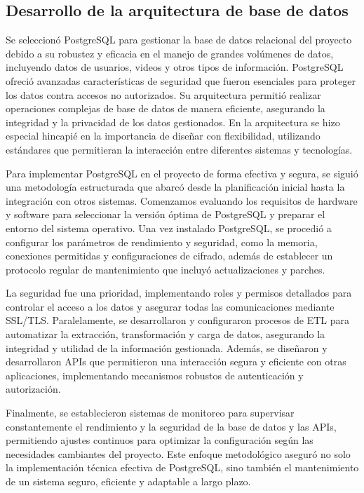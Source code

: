 \subsection{Desarrollo de la arquitectura de base de datos}

Se seleccionó PostgreSQL para gestionar la base de datos relacional del proyecto debido a su robustez y eficacia en el manejo de grandes volúmenes de datos, incluyendo datos de usuarios, videos y otros tipos de información. PostgreSQL ofreció avanzadas características de seguridad que fueron esenciales para proteger los datos contra accesos no autorizados. Su arquitectura permitió realizar operaciones complejas de base de datos de manera eficiente, asegurando la integridad y la privacidad de los datos gestionados. En la arquitectura se hizo especial hincapié en la importancia de diseñar con flexibilidad, utilizando estándares que permitieran la interacción entre diferentes sistemas y tecnologías.

Para implementar PostgreSQL en el proyecto de forma efectiva y segura, se siguió una metodología estructurada que abarcó desde la planificación inicial hasta la integración con otros sistemas. Comenzamos evaluando los requisitos de hardware y software para seleccionar la versión óptima de PostgreSQL y preparar el entorno del sistema operativo. Una vez instalado PostgreSQL, se procedió a configurar los parámetros de rendimiento y seguridad, como la memoria, conexiones permitidas y configuraciones de cifrado, además de establecer un protocolo regular de mantenimiento que incluyó actualizaciones y parches.

La seguridad fue una prioridad, implementando roles y permisos detallados para controlar el acceso a los datos y asegurar todas las comunicaciones mediante SSL/TLS. Paralelamente, se desarrollaron y configuraron procesos de ETL para automatizar la extracción, transformación y carga de datos, asegurando la integridad y utilidad de la información gestionada. Además, se diseñaron y desarrollaron APIs que permitieron una interacción segura y eficiente con otras aplicaciones, implementando mecanismos robustos de autenticación y autorización.

Finalmente, se establecieron sistemas de monitoreo para supervisar constantemente el rendimiento y la seguridad de la base de datos y las APIs, permitiendo ajustes continuos para optimizar la configuración según las necesidades cambiantes del proyecto. Este enfoque metodológico aseguró no solo la implementación técnica efectiva de PostgreSQL, sino también el mantenimiento de un sistema seguro, eficiente y adaptable a largo plazo.


